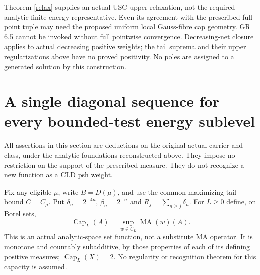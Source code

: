 \documentclass[11pt]{article}
\newcommand{\MA}{\operatorname{MA}}
\newcommand{\C}{\mathcal C}
\begin{document}
Theorem \ref{relax} supplies an actual USC upper relaxation, not the
required analytic finite-energy representative. Even its agreement with
the prescribed full-point tuple may need the proposed uniform local
Gauss-fibre cap geometry. GR 6.5 cannot be invoked without full pointwise
convergence. Decreasing-net closure applies to actual decreasing
positive weights; the tail suprema and their upper regularizations above
have no proved positivity. No poles are assigned to a generated solution
by this construction.

\section{A single diagonal sequence for every bounded-test energy sublevel}
All assertions in this section are deductions on the original actual
carrier and class, under the analytic foundations reconstructed above.
They impose no restriction on the support of the prescribed measure.
They do not recognize a new function as a CLD psh weight.

Fix any eligible $\mu$, write $B=D(\mu)$, and use the common maximizing
tail bound $C=C_\mu$. Put $\delta_n=2^{-4n}$, $\beta_n=2^{-n}$ and
$R_j=\sum_{n\ge j}\delta_n$. For $L\ge0$ define, on Borel sets,
\[
 \operatorname{Cap}_L(A)=\sup_{w\in\C_L}\MA(w)(A).
\]
This is an actual analytic-space set function, not a substitute MA
operator. It is monotone and countably subadditive, by those properties
of each of its defining positive measures; $\operatorname{Cap}_L(X)=2$.
No regularity or recognition theorem for this capacity is assumed.
\end{document}
